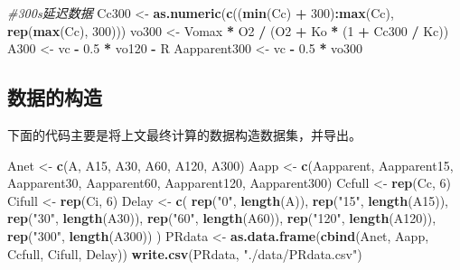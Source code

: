 \documentclass[
]{krantz}
\makeatletter
\newenvironment{Shaded}{\begin{snugshade}}{\end{snugshade}}
\newcommand{\CommentTok}[1]{\textcolor[rgb]{0.56,0.35,0.01}{\textit{#1}}}
\newcommand{\DecValTok}[1]{\textcolor[rgb]{0.00,0.00,0.81}{#1}}
\newcommand{\FloatTok}[1]{\textcolor[rgb]{0.00,0.00,0.81}{#1}}
\newcommand{\KeywordTok}[1]{\textcolor[rgb]{0.13,0.29,0.53}{\textbf{#1}}}
\newcommand{\NormalTok}[1]{#1}
\newcommand{\OperatorTok}[1]{\textcolor[rgb]{0.81,0.36,0.00}{\textbf{#1}}}
\newcommand{\StringTok}[1]{\textcolor[rgb]{0.31,0.60,0.02}{#1}}
\newenvironment{kframe}{%
\medskip{}
\setlength{\fboxsep}{.8em}
 \def\at@end@of@kframe{}%
 \ifinner\ifhmode%
  \def\at@end@of@kframe{\end{minipage}}%
  \begin{minipage}{\columnwidth}%
 \fi\fi%
 \def\FrameCommand##1{\hskip\@totalleftmargin \hskip-\fboxsep
 \colorbox{shadecolor}{##1}\hskip-\fboxsep
     \hskip-\linewidth \hskip-\@totalleftmargin \hskip\columnwidth}%
 \MakeFramed {\advance\hsize-\width
   \@totalleftmargin\z@ \linewidth\hsize
   \@setminipage}}%
 {\par\unskip\endMakeFramed%
 \at@end@of@kframe}
\renewenvironment{Shaded}{\begin{kframe}}{\end{kframe}}
\makeatother
\begin{document}
\begin{Shaded}
\begin{Highlighting}[]
\CommentTok{\#300s延迟数据}
\NormalTok{Cc300 \textless{}{-}}\StringTok{ }\KeywordTok{as.numeric}\NormalTok{(}\KeywordTok{c}\NormalTok{((}\KeywordTok{min}\NormalTok{(Cc) }\OperatorTok{+}\StringTok{ }\DecValTok{300}\NormalTok{)}\OperatorTok{:}\KeywordTok{max}\NormalTok{(Cc), }\KeywordTok{rep}\NormalTok{(}\KeywordTok{max}\NormalTok{(Cc), }\DecValTok{300}\NormalTok{)))}
\NormalTok{vo300 \textless{}{-}}\StringTok{ }\NormalTok{Vomax }\OperatorTok{*}\StringTok{ }\NormalTok{O2 }\OperatorTok{/}\StringTok{ }\NormalTok{(O2 }\OperatorTok{+}\StringTok{ }\NormalTok{Ko }\OperatorTok{*}\StringTok{ }\NormalTok{(}\DecValTok{1} \OperatorTok{+}\StringTok{ }\NormalTok{Cc300 }\OperatorTok{/}\StringTok{ }\NormalTok{Kc))}
\NormalTok{A300 \textless{}{-}}\StringTok{ }\NormalTok{vc }\OperatorTok{{-}}\StringTok{ }\FloatTok{0.5} \OperatorTok{*}\StringTok{ }\NormalTok{vo120 }\OperatorTok{{-}}\StringTok{ }\NormalTok{R}
\NormalTok{Aapparent300 \textless{}{-}}\StringTok{ }\NormalTok{vc }\OperatorTok{{-}}\StringTok{ }\FloatTok{0.5} \OperatorTok{*}\StringTok{ }\NormalTok{vo300 }
\end{Highlighting}
\end{Shaded}

\hypertarget{multi4}{%
\subsection{数据的构造}\label{multi4}}

下面的代码主要是将上文最终计算的数据构造数据集，并导出。

\begin{Shaded}
\begin{Highlighting}[]
\NormalTok{Anet \textless{}{-}}\StringTok{ }\KeywordTok{c}\NormalTok{(A, A15, A30, A60, A120, A300)}
\NormalTok{Aapp \textless{}{-}}
\StringTok{  }\KeywordTok{c}\NormalTok{(Aapparent,}
\NormalTok{    Aapparent15,}
\NormalTok{    Aapparent30,}
\NormalTok{    Aapparent60,}
\NormalTok{    Aapparent120,}
\NormalTok{    Aapparent300)}
\NormalTok{Ccfull \textless{}{-}}\StringTok{ }\KeywordTok{rep}\NormalTok{(Cc, }\DecValTok{6}\NormalTok{)}
\NormalTok{Cifull \textless{}{-}}\StringTok{ }\KeywordTok{rep}\NormalTok{(Ci, }\DecValTok{6}\NormalTok{)}
\NormalTok{Delay \textless{}{-}}
\StringTok{  }\KeywordTok{c}\NormalTok{(}
    \KeywordTok{rep}\NormalTok{(}\StringTok{"0"}\NormalTok{, }\KeywordTok{length}\NormalTok{(A)),}
    \KeywordTok{rep}\NormalTok{(}\StringTok{"15"}\NormalTok{, }\KeywordTok{length}\NormalTok{(A15)),}
    \KeywordTok{rep}\NormalTok{(}\StringTok{"30"}\NormalTok{, }\KeywordTok{length}\NormalTok{(A30)),}
    \KeywordTok{rep}\NormalTok{(}\StringTok{"60"}\NormalTok{, }\KeywordTok{length}\NormalTok{(A60)),}
    \KeywordTok{rep}\NormalTok{(}\StringTok{"120"}\NormalTok{, }\KeywordTok{length}\NormalTok{(A120)),}
    \KeywordTok{rep}\NormalTok{(}\StringTok{"300"}\NormalTok{, }\KeywordTok{length}\NormalTok{(A300))}
\NormalTok{  )}
\NormalTok{PRdata \textless{}{-}}\StringTok{ }\KeywordTok{as.data.frame}\NormalTok{(}\KeywordTok{cbind}\NormalTok{(Anet, Aapp, Ccfull, Cifull, Delay))}
\KeywordTok{write.csv}\NormalTok{(PRdata, }\StringTok{"./data/PRdata.csv"}\NormalTok{)}
\end{Highlighting}
\end{Shaded}
\end{document}
